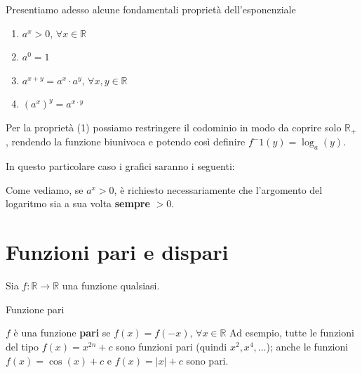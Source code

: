 \documentclass[12pt]{report}
\newcommand{\R}{\mathbb{R}}
\begin{document}
	Presentiamo adesso alcune fondamentali proprietà dell'esponenziale
	\begin{enumerate}
		
		\item $a^x > 0,\,\forall x \in \R$
		
		\item $a^0 = 1$
		
		\item $a^{x+y} = a^x \cdot a^y,\, \forall x, y \in \R$
		
		\item $(a^x)^y = a^{x \cdot y}$
		
	\end{enumerate}
	
	Per la proprietà (1) possiamo restringere il codominio in modo da coprire solo $\R_+$, rendendo la funzione biunivoca e potendo così definire $f^-1(y) = \log_a(y)$.
	
	In questo particolare caso i grafici saranno i seguenti:
	\begin{center}
		
		
	\end{center}
	
	Come vediamo, se $a^x > 0$, è richiesto necessariamente che l'argomento del logaritmo sia a sua volta \textbf{sempre} $> 0$.
	
	\section{Funzioni pari e dispari}
	
	Sia $f: \R \to \R$ una funzione qualsiasi.
	\begin{definizione}{Funzione pari}{}
		
		$f$ è una funzione \textbf{pari} se $f(x) = f(-x),\,\forall x \in \R$
		Ad esempio, tutte le funzioni del tipo $f(x) = x^{2n} + c$ sono funzioni pari (quindi $x^2, x^4, \dots$); anche le funzioni $f(x) = \cos(x) + c$ e $f(x) = |x| + c$ sono pari.
		
	\end{definizione}
	
\end{document}
